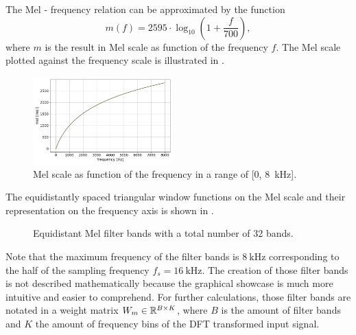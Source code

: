 The Mel - frequency relation can be approximated by the function
\begin{equation}\label{eq:signal_mfcc_mel}
  m(f) = 2595 \cdot \log_{10} \left(1 + \frac{f}{700} \right),
\end{equation}
where $m$ is the result in Mel scale as function of the frequency $f$.
The Mel scale plotted against the frequency scale is illustrated in .
\begin{figure}[!ht]
  \centering
  \includegraphics[width=0.48\textwidth]{./3_signal/figs/signal_mfcc_mel_scale.png}
  \caption{Mel scale as function of the frequency in a range of [0, \SI{8}{\kilo\hertz}].}
  \label{fig:signal_mfcc_mel_scale}
\end{figure}
\FloatBarrier
\noindent
The equidistantly spaced triangular window functions on the Mel scale and their representation on the frequency axis is shown in .
\begin{figure}[!ht]
  \centering
  \quad
  \caption{Equidistant Mel filter bands with a total number of 32 bands.}
  \label{fig:filter_bands}
\end{figure}
\FloatBarrier
\noindent
Note that the maximum frequency of the filter bands is $\SI{8}{\kilo\hertz}$ corresponding to the half of the sampling frequency $f_s = \SI{16}{\kilo\hertz}$.
The creation of those filter bands is not described mathematically because the graphical showcase is much more intuitive and easier to comprehend.
For further calculations, those filter bands are notated in a weight matrix $W_m \in \mathbb{R}^{B \times K}$, where $B$ is the amount of filter bands and $K$ the amount of frequency bins of the DFT transformed input signal.

